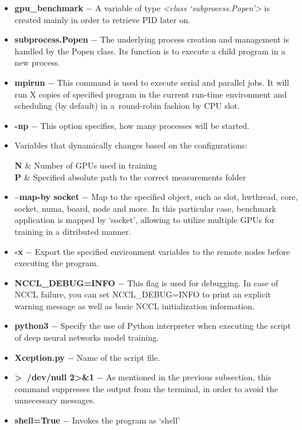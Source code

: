 \begin{itemize}
    \item \textbf{gpu\_benchmark} $-$ A variable of type
    \emph{<class `subprocess.Popen'>} is created mainly in order to
    retrieve PID later on.
    \item \textbf{subprocess.Popen} $-$ The underlying process creation and
    management is handled by the Popen class. Its function is to execute
    a child program in a new process.
    \item \textbf{mpirun} $-$ This command is used to execute serial and
    parallel jobs. It will run X copies of specified program in the current
    run-time environment and scheduling (by default) in a~round-robin fashion
    by CPU slot.
    \item \textbf{-np} $-$ This option specifies, how many processes will be
    started.
    \item Variables that dynamically changes based on the configurations:
    \begin{conditions}
        \textbf{N} & Number of GPUs used in training \\
        \textbf{P} & Specified absolute path to the correct measurements folder \\
    \end{conditions}
    \item \textbf{--map-by socket} $-$ Map to the specified object, such as 
    slot, hwthread, core, socket, numa, board, node and more. In this
    particular case, benchmark application is mapped by `socket', allowing to
    utilize multiple GPUs for training in a ditributed manner.
    \item \textbf{-x} $-$ Export the specified environment variables to the
    remote nodes before executing the program.
    \item \textbf{NCCL\_DEBUG=INFO} $-$ This flag is used for debugging. In
    case of NCCL failure, you can set NCCL\_DEBUG=INFO to print an explicit
    warning message as well as basic NCCL initialization information.
    \item \textbf{python3} $-$ Specify the use of Python interpreter when
    executing the script of deep neural networks model training.
    \item \textbf{Xception.py} $-$ Name of the script file.
    \item \textbf{\textgreater~/dev/null 2\textgreater\&1} $-$
    As mentioned in the previous subsection, this command suppresses the
    output from the terminal, in order to avoid the unnecessary messages.
    \item \textbf{shell=True} $-$ Invokes the program as `shell'
\end{itemize}


